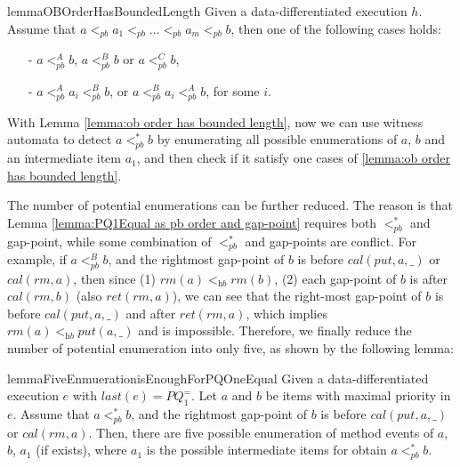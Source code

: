 \begin{restatable}{lemma}{OBOrderHasBoundedLength}
\label{lemma:ob order has bounded length}
Given a data-differentiated execution $h$. Assume that $a <_{\textit{pb}} a_1 <_{\textit{pb}} \ldots <_{\textit{pb}} a_m <_{\textit{pb}} b$, then one of the following cases holds:

\begin{itemize}
\setlength{\itemsep}{0.5pt}
\item[-] $a <_{\textit{pb}}^A b$, $a <_{\textit{pb}}^B b$ or $a <_{\textit{pb}}^C b$,

\item[-] $a <_{\textit{pb}}^A a_i <_{\textit{pb}}^B b$, or $a <_{\textit{pb}}^B a_i <_{\textit{pb}}^A b$, for some $i$.
\end{itemize}
\end{restatable}

With Lemma \ref{lemma:ob order has bounded length}, now we can use witness automata to detect $a <_{\textit{pb}}^* b$ by enumerating all possible enumerations of $a$, $b$ and an intermediate item $a_1$, and then check if it satisfy one cases of \ref{lemma:ob order has bounded length}.

The number of potential enumerations can be further reduced. The reason is that Lemma \ref{lemma:PQ1Equal as pb order and gap-point} requires both $<_{\textit{pb}}^*$ and gap-point, while some combination of $<_{\textit{pb}}^*$ and gap-points are conflict. For example, if $a <_{\textit{pb}}^B b$, and the rightmost gap-point of $b$ is before $\textit{cal}(\textit{put},a,\_)$ or $\textit{cal}(\textit{rm},a)$, then since (1) $\textit{rm}(a) <_{\textit{hb}} \textit{rm}(b)$, (2) each gap-point of $b$ is after $\textit{cal}(\textit{rm},b)$ (also $\textit{ret}(\textit{rm},a)$), we can see that the right-most gap-point of $b$ is before $\textit{cal}(\textit{put},a,\_)$ and after $\textit{ret}(\textit{rm},a)$, which implies $\textit{rm}(a) <_{\textit{hb}} \textit{put}(a,\_)$ and is impossible. Therefore, we finally reduce the number of potential enumeration into only five, as shown by the following lemma:

\begin{restatable}{lemma}{FiveEnmuerationisEnoughForPQOneEqual}
\label{lemma:five enumeration is enough for PQ1Equal}
Given a data-differentiated execution $e$ with $\textit{last}(e) = \textit{PQ}_1^{=}$. Let $a$ and $b$ be items with maximal priority in $e$. Assume that $a <_{\textit{pb}}^* b$, and the rightmost gap-point of $b$ is before $\textit{cal}(\textit{put},a,\_)$ or $\textit{cal}(\textit{rm},a)$. Then, there are five possible enumeration of method events of $a$, $b$, $a_1$ (if exists), where $a_1$ is the possible intermediate items for obtain $a <_{\textit{pb}}^* b$.
\end{restatable}

